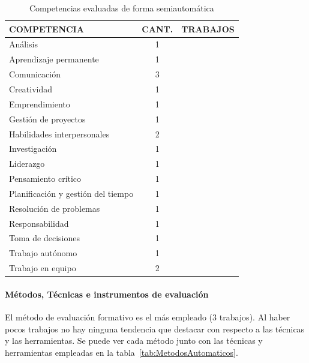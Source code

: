 \begin{table}
  \begin{center}
  \begin{tabular}{| m{6cm} | c | m{5cm} |}
    \hline
    COMPETENCIA & CANT. & TRABAJOS\\
    \hline
    \hline
    Análisis & 1 & \cite{andre2011formal} \\
    \hline
    Aprendizaje permanente & 1 & \cite{andre2011formal}   \\
    \hline
    Comunicación & 3 & \cite{andre2011formal,rayon2014web,bedek2011behavioral}  \\
    \hline
    Creatividad & 1 & \cite{andre2011formal}   \\
    \hline
    Emprendimiento & 1 & \cite{guenaga2013serious} \\
    \hline
    Gestión de proyectos & 1 & \cite{andre2011formal} \\
    \hline
    Habilidades interpersonales & 2 & \cite{andre2011formal,rayon2014web}  \\
    \hline
    Investigación & 1 & \cite{andre2011formal}  \\
    \hline
    Liderazgo & 1 & \cite{andre2011formal}  \\
    \hline
    Pensamiento crítico & 1 & \cite{andre2011formal} \\
    \hline
    Planificación y gestión del tiempo & 1 & \cite{andre2011formal} \\
    \hline
    Resolución de problemas & 1 & \cite{guenaga2013serious} \\
    \hline
    Responsabilidad & 1 & \cite{andre2011formal}  \\
    \hline 
    Toma de decisiones & 1 & \cite{andre2011formal}   \\
    \hline
    Trabajo autónomo & 1 & \cite{andre2011formal} \\
    \hline
    Trabajo en equipo & 2 & \cite{andre2011formal,fidalgo:2015}  \\
    \hline
  \end{tabular}
\end{center}
\caption{Competencias evaluadas de forma semiautomática}
\label{tab:CompetenciasAutomaticas}
\end{table} 

\paragraph*{Métodos, Técnicas e instrumentos de evaluación}
El método de evaluación formativo es el más empleado (3 trabajos). Al haber pocos trabajos no hay ninguna tendencia que destacar con respecto a las técnicas y las herramientas. Se puede ver cada método junto con las técnicas y herramientas empleadas en la tabla~\ref{tab:MetodosAutomaticos}.

